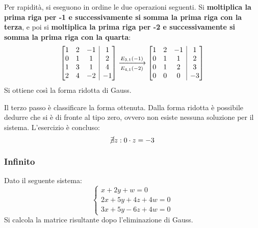 \documentclass[a4paper]{article}
\makeatletter
\newenvironment{rowequmatbra}[1]{\left[\array{@{}#1@{}}}{\endarray\right]}
\makeatother
\begin{document}
	Per rapidità, si eseguono in ordine le due operazioni seguenti. Si \textbf{moltiplica la prima riga per -1 e successivamente si somma la prima riga con la terza}, e poi si \textbf{moltiplica la prima riga per -2 e successivamente si somma la prima riga con la quarta}:
	\begin{equation*}
		\begin{rowequmatbra}{ccc|c}
			1  & 2 & -1 &  1 \\
			0  & 1 &  1 &  2 \\
			1  & 3 &  1 &  4 \\
			2  & 4 & -2 & -1
		\end{rowequmatbra} \xlongrightarrow[E_{4,1}\left(-2\right)]{E_{3,1}\left(-1\right)}
		\begin{rowequmatbra}{ccc|c}
			1  & 2 & -1 &  1 \\
			0  & 1 &  1 &  2 \\
			0  & 1 &  2 &  3 \\
			0  & 0 &  0 & -3
		\end{rowequmatbra}
	\end{equation*}
	Si ottiene così la forma ridotta di Gauss.\newline
	
	\noindent
	Il \textcolor{Red3}{terzo passo} è classificare la forma ottenuta. Dalla forma ridotta è possibile dedurre che si è di fronte al tipo zero, ovvero non esiste nessuna soluzione per il sistema. L'esercizio è concluso:
	\begin{equation*}
		\cancel{\exists} z : 0 \cdot z = -3
	\end{equation*}\newpage

	\subsubsection{Infinito}
	
	Dato il seguente sistema:
	\begin{equation*}
		\begin{cases}
			x + 2y + w = 0 	\\
			2x + 5y + 4z + 4w = 0 \\
			3x + 5y - 6z + 4w = 0
		\end{cases}
	\end{equation*}
	Si calcola la matrice risultante dopo l'eliminazione di Gauss.\newline
	
\end{document}

